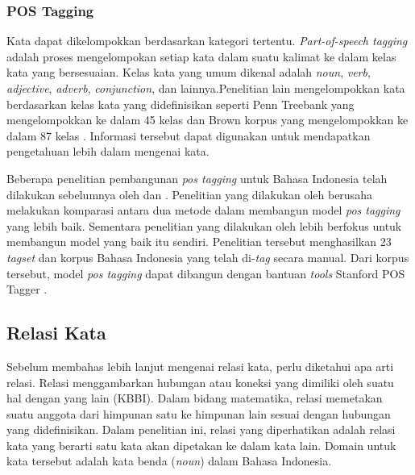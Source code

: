 
\subsubsection{POS Tagging}
Kata dapat dikelompokkan berdasarkan kategori tertentu. \textit{Part-of-speech tagging} adalah proses mengelompokan setiap kata dalam suatu kalimat ke dalam kelas kata yang bersesuaian. Kelas kata yang umum dikenal adalah \textit{noun}, \textit{verb}, \textit{adjective}, \textit{adverb}, \textit{conjunction}, dan lainnya.Penelitian lain mengelompokkan kata berdasarkan kelas kata yang didefinisikan seperti Penn Treebank yang mengelompokkan ke dalam 45 kelas \citep{marcus1993building} dan Brown korpus yang mengelompokkan ke dalam 87 kelas \citep{francis1979brown}. Informasi tersebut dapat digunakan untuk mendapatkan pengetahuan lebih dalam mengenai kata. 

Beberapa penelitian pembangunan \textit{pos tagging} untuk Bahasa Indonesia telah dilakukan sebelumnya oleh \cite{adriani2009statistical} dan \cite{dinakaramani2014designing}. Penelitian yang dilakukan oleh \cite{adriani2009statistical} berusaha melakukan komparasi antara dua metode dalam membangun model \textit{pos tagging} yang lebih baik. Sementara penelitian yang dilakukan oleh \cite{dinakaramani2014designing} lebih berfokus untuk membangun model yang baik itu sendiri. Penelitian tersebut menghasilkan 23 \textit{tagset} dan korpus Bahasa Indonesia yang telah di-\textit{tag} secara manual. Dari korpus tersebut, model \textit{pos tagging} dapat dibangun dengan bantuan \textit{tools} Stanford POS Tagger \citep{toutanova2003feature}.

\subsection{Relasi Kata}
Sebelum membahas lebih lanjut mengenai relasi kata, perlu diketahui apa arti relasi. Relasi menggambarkan hubungan atau koneksi yang dimiliki oleh suatu hal dengan yang lain (KBBI). Dalam bidang matematika, relasi memetakan suatu anggota dari himpunan satu ke himpunan lain sesuai dengan hubungan yang didefinisikan. Dalam penelitian ini, relasi yang diperhatikan adalah relasi kata yang berarti satu kata akan dipetakan ke dalam kata lain. Domain untuk kata tersebut adalah kata benda (\textit{noun}) dalam Bahasa Indonesia.

